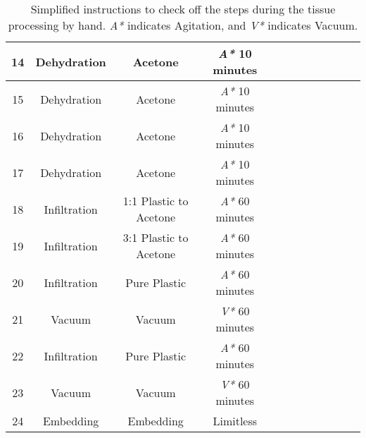 \begin{table}
\begin{tabular}{|c|c|c|c|c|c|c|c|c|c|c|c|}
		14 &Dehydration & Acetone & \emph{A*} 10 minutes & & & & & & & &\\ \hline
		15 &Dehydration & Acetone & \emph{A*} 10 minutes & & & & & & & &\\ \hline
		16 &Dehydration & Acetone & \emph{A*} 10 minutes & & & & & & & &\\ \hline
		17 &Dehydration & Acetone & \emph{A*} 10 minutes & & & & & & & &\\ \hline \hline
		18 &Infiltration & 1:1 Plastic to Acetone & \emph{A*} 60 minutes & & & & & & & &\\ \hline 
		19 &Infiltration & 3:1 Plastic to Acetone & \emph{A*} 60 minutes & & & & & & & &\\ \hline 
		20 &Infiltration & Pure Plastic & \emph{A*} 60 minutes & & & & & & & &\\ \hline 
		21 &Vacuum & Vacuum & \emph{V*} 60 minutes & & & & & & & &\\ \hline 
		22 &Infiltration & Pure Plastic & \emph{A*} 60 minutes & & & & & & & &\\ \hline 
		23 &Vacuum & Vacuum & \emph{V*} 60 minutes & & & & & & & &\\ \hline 
		24 &Embedding & Embedding & Limitless & & & & & & & &\\ \hline 
	\end{tabular}
\caption{Simplified instructions to check off the steps during the tissue processing by hand.  \emph{A*} indicates Agitation, and \emph{V*} indicates Vacuum.}
\end{table}

